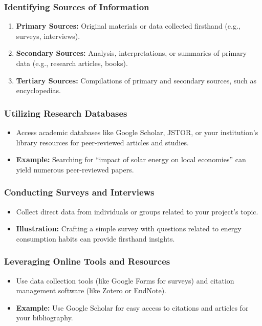 \documentclass[aspectratio=169]{beamer}
\begin{document}
\begin{frame}[fragile]
    \frametitle{Identifying Sources of Information}
    \begin{enumerate}
        \item \textbf{Primary Sources:} Original materials or data collected firsthand (e.g., surveys, interviews).
        \item \textbf{Secondary Sources:} Analysis, interpretations, or summaries of primary data (e.g., research articles, books).
        \item \textbf{Tertiary Sources:} Compilations of primary and secondary sources, such as encyclopedias.
    \end{enumerate}
\end{frame}

\begin{frame}[fragile]
    \frametitle{Utilizing Research Databases}
    \begin{itemize}
        \item Access academic databases like Google Scholar, JSTOR, or your institution's library resources for peer-reviewed articles and studies.
        \item \textbf{Example:} Searching for “impact of solar energy on local economies” can yield numerous peer-reviewed papers.
    \end{itemize}
\end{frame}

\begin{frame}[fragile]
    \frametitle{Conducting Surveys and Interviews}
    \begin{itemize}
        \item Collect direct data from individuals or groups related to your project's topic.
        \item \textbf{Illustration:} Crafting a simple survey with questions related to energy consumption habits can provide firsthand insights.
    \end{itemize}
\end{frame}

\begin{frame}[fragile]
    \frametitle{Leveraging Online Tools and Resources}
    \begin{itemize}
        \item Use data collection tools (like Google Forms for surveys) and citation management software (like Zotero or EndNote).
        \item \textbf{Example:} Use Google Scholar for easy access to citations and articles for your bibliography.
    \end{itemize}
\end{frame}
\end{document}
